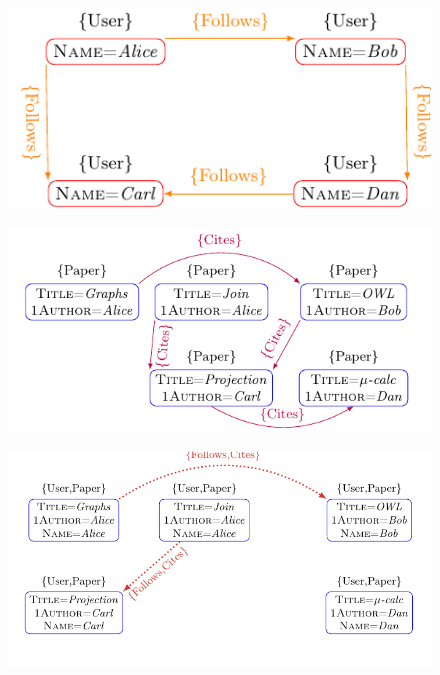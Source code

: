\begin{figure}[!t]
	\centering
	\begin{adjustbox}{max width=\textwidth}
		\begin{minipage}[b]{0.5\textwidth}
			\centering
			\includegraphics[scale=0.7]{fig/03joins/esn2.pdf}
			\label{g:en}
		\end{minipage}
		\begin{minipage}[b]{0.5\textwidth}
			\centering
			\includegraphics[scale=0.7]{fig/03joins/projects2}
			\label{g:dep}
		\end{minipage}
	\end{adjustbox}
	\begin{adjustbox}{max width=\textwidth}
		\begin{minipage}[b]{0.5\textwidth}
			\centering
			\includegraphics[scale=0.6]{fig/03joins/conj2}

\end{minipage}
\end{adjustbox}
\end{figure}
